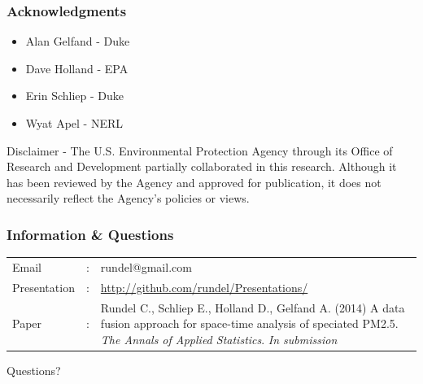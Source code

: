 \documentclass[t]{beamer}\usepackage[]{graphicx}\usepackage[]{color}
\begin{document}

\begin{frame}
\frametitle{Acknowledgments}

\vfill


\begin{itemize}
  \item Alan Gelfand - Duke
  \vspace{3mm} \item Dave Holland - EPA
  \vspace{3mm} \item Erin Schliep - Duke
  \vspace{3mm} \item Wyat Apel - NERL
\end{itemize}


\vfill

{\footnotesize
Disclaimer - The U.S. Environmental Protection Agency through its Office of Research and Development partially collaborated in this research. Although it has been reviewed by the Agency and approved for publication, it does not necessarily reflect the Agency's policies or views.
}
\end{frame}


\begin{frame}
\frametitle{Information \& Questions}

\vfill

\begin{center}
{\Large
\renewcommand*\arraystretch{1.5}
\begin{tabular}{llp{8cm}}
Email        & : & {\normalsize rundel@gmail.com} \\
Presentation & : & {\normalsize \url{http://github.com/rundel/Presentations/}} \\
Paper        & : & {\footnotesize Rundel C., Schliep E., Holland D., Gelfand A. (2014)
                                  A data fusion approach for space-time analysis of speciated PM2.5.
                                  \textit{The Annals of Applied Statistics}. \textit{In submission}}
\end{tabular}
}
\end{center}

\vfill

\pause

\begin{center}
{\Large Questions?}
\end{center}

\vfill

\end{frame}
\end{document}
